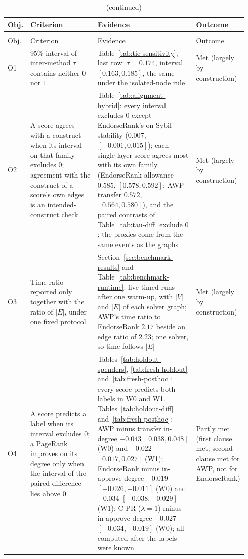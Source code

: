 \begingroup
{}\small\setlength{\tabcolsep}{3.5pt}\captionsetup{font=normalsize}
\begin{longtable}{p{0.05\linewidth}p{0.33\linewidth}p{0.44\linewidth}p{0.12\linewidth}}
\caption{Research objectives, the criterion stated in Chapter~\ref{ch:introduction}, and the outcome.}
\label{tab:objectives-achievement}\\
\toprule
Obj. & Criterion & Evidence & Outcome \\
\midrule
\endfirsthead
\caption[]{(continued)}\\
\toprule
Obj. & Criterion & Evidence & Outcome \\
\midrule
\endhead
\bottomrule
\endlastfoot
O1 & 95\% interval of inter-method $\tau$ contains neither $0$ nor $1$ & Table~\ref{tab:tie-sensitivity}, last row: $\tau=0.174$, interval $[0.163,0.185]$, the same under the isolated-node rule & Met (largely by construction) \\
O2 & A score agrees with a construct when its interval on that family excludes $0$; agreement with the construct of a score's own edges is an intended-construct check & Table~\ref{tab:alignment-hybrid}: every interval excludes $0$ except EndorseRank's on Sybil stability ($0.007$, $[-0.001,0.015]$); each single-layer score agrees most with its own family (EndorseRank allowance $0.585$, $[0.578,0.592]$; AWP transfer $0.572$, $[0.564,0.580]$), and the paired contrasts of Table~\ref{tab:tau-diff} exclude $0$; the proxies come from the same events as the graphs & Met (largely by construction) \\
O3 & Time ratio reported only together with the ratio of $|E|$, under one fixed protocol & Section~\ref{sec:benchmark-results} and Table~\ref{tab:benchmark-runtime}: five timed runs after one warm-up, with $|V|$ and $|E|$ of each solver graph; AWP's time ratio to EndorseRank $2.17$ beside an edge ratio of $2.23$; one solver, so time follows $|E|$ & Met (largely by construction) \\
O4 & A score predicts a label when its interval excludes $0$; a PageRank improves on its degree only when the interval of the paired difference lies above $0$ & Tables~\ref{tab:holdout-spenders}, \ref{tab:fresh-holdout} and~\ref{tab:fresh-posthoc}: every score predicts both labels in W0 and W1. Tables~\ref{tab:holdout-diff} and~\ref{tab:fresh-posthoc}: AWP minus transfer in-degree $+0.043$ $[0.038,0.048]$ (W0) and $+0.022$ $[0.017,0.027]$ (W1); EndorseRank minus in-approve degree $-0.019$ $[-0.026,-0.011]$ (W0) and $-0.034$ $[-0.038,-0.029]$ (W1); C-PR ($\lambda=1$) minus in-approve degree $-0.027$ $[-0.034,-0.019]$ (W0); all computed after the labels were known & Partly met (first clause met; second clause met for AWP, not for EndorseRank) \\

\end{longtable}
